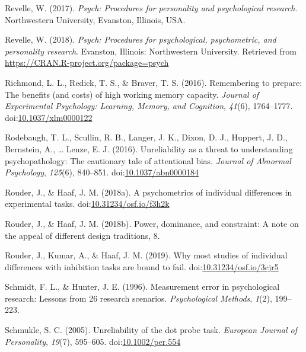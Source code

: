 \documentclass[english,,man,floatsintext]{apa6}
\begin{document}
\leavevmode\hypertarget{ref-revelle_w_psych:_2017}{}%
Revelle, W. (2017). \emph{Psych: Procedures for personality and psychological research}. Northwestern University, Evanston, Illinois, USA.

\leavevmode\hypertarget{ref-R-psych}{}%
Revelle, W. (2018). \emph{Psych: Procedures for psychological, psychometric, and personality research}. Evanston, Illinois: Northwestern University. Retrieved from \url{https://CRAN.R-project.org/package=psych}

\leavevmode\hypertarget{ref-richmond_remembering_2016}{}%
Richmond, L. L., Redick, T. S., \& Braver, T. S. (2016). Remembering to prepare: The benefits (and costs) of high working memory capacity. \emph{Journal of Experimental Psychology: Learning, Memory, and Cognition}, \emph{41}(6), 1764--1777. doi:\href{https://doi.org/10.1037/xlm0000122}{10.1037/xlm0000122}

\leavevmode\hypertarget{ref-rodebaugh_unreliability_2016}{}%
Rodebaugh, T. L., Scullin, R. B., Langer, J. K., Dixon, D. J., Huppert, J. D., Bernstein, A., \ldots{} Lenze, E. J. (2016). Unreliability as a threat to understanding psychopathology: The cautionary tale of attentional bias. \emph{Journal of Abnormal Psychology}, \emph{125}(6), 840--851. doi:\href{https://doi.org/10.1037/abn0000184}{10.1037/abn0000184}

\leavevmode\hypertarget{ref-rouder_psychometrics_2018}{}%
Rouder, J., \& Haaf, J. M. (2018a). A psychometrics of individual differences in experimental tasks. doi:\href{https://doi.org/10.31234/osf.io/f3h2k}{10.31234/osf.io/f3h2k}

\leavevmode\hypertarget{ref-rouder_power_2018}{}%
Rouder, J., \& Haaf, J. M. (2018b). Power, dominance, and constraint: A note on the appeal of different design traditions, 8.

\leavevmode\hypertarget{ref-rouder_why_2019}{}%
Rouder, J., Kumar, A., \& Haaf, J. M. (2019). Why most studies of individual differences with inhibition tasks are bound to fail. doi:\href{https://doi.org/10.31234/osf.io/3cjr5}{10.31234/osf.io/3cjr5}

\leavevmode\hypertarget{ref-schmidt_measurement_1996}{}%
Schmidt, F. L., \& Hunter, J. E. (1996). Measurement error in psychological research: Lessons from 26 research scenarios. \emph{Psychological Methods}, \emph{1}(2), 199--223.

\leavevmode\hypertarget{ref-schmukle_unreliability_2005}{}%
Schmukle, S. C. (2005). Unreliability of the dot probe task. \emph{European Journal of Personality}, \emph{19}(7), 595--605. doi:\href{https://doi.org/10.1002/per.554}{10.1002/per.554}
\end{document}
